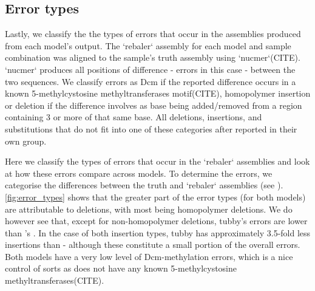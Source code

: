 \subsection{Error types}

Lastly, we classify the the types of errors that occur in the assemblies produced from each model's output. The `rebaler` assembly for each model and sample combination was aligned to the sample's truth assembly using `nucmer`(CITE). `nucmer` produces all positions of difference - errors in this case - between the two sequences. We classify errors as Dcm if the reported difference occurs in a known 5-methylcystosine methyltransferases motif(CITE), homopolymer insertion or deletion if the difference involves as base being added/removed from a region containing 3 or more of that same base. All deletions, insertions, and substitutions that do not fit into one of these categories after reported in their own group.

Here we classify the types of errors that occur in the `rebaler` assemblies and look at how these errors compare across models. To determine the errors, we categorise the differences between the truth and `rebaler` assemblies (see ). \autoref{fig:error_types} shows that the greater part of the error types (for both models) are attributable to deletions, with most being homopolymer deletions. We do however see that, except for non-homopolymer deletions, tubby's errors are lower than \guppy{}'s . In the case of both insertion types, tubby has approximately 3.5-fold less insertions than \guppy{} - although these constitute a small portion of the overall errors. Both models have a very low level of Dcm-methylation errors, which is a nice control of sorts as \mtb{} does not have any known 5-methylcystosine methyltransferases(CITE).


